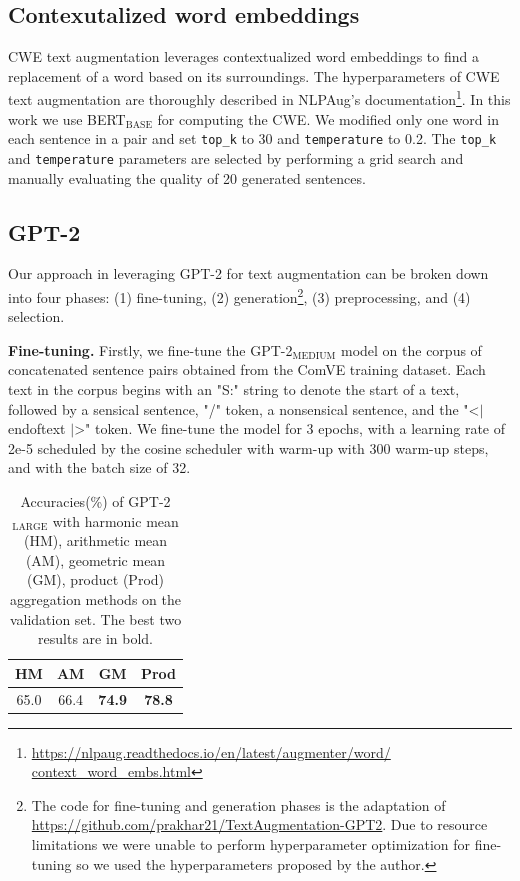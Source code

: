 \documentclass[10pt, a4paper]{article}
\begin{document}
\subsection{Contexutalized word embeddings}
\label{cwe}
CWE text augmentation leverages contextualized word embeddings to find a replacement of a word based on its surroundings. The hyperparameters of CWE text augmentation are thoroughly described in NLPAug's documentation\footnote{\href{https://nlpaug.readthedocs.io/en/latest/augmenter/\\word/context\_word\_embs.html}{https://nlpaug.readthedocs.io/en/latest/augmenter/word/\\context\_word\_embs.html}}. In this work we use BERT$_{\text{BASE}}$ for computing the CWE. We modified only one word in each sentence in a pair and set \texttt{top\_k} to 30 and \texttt{temperature} to 0.2. The \texttt{top\_k} and \texttt{temperature} parameters are selected by performing a grid search and manually evaluating the quality of 20 generated sentences.

\subsection{GPT-2}
Our approach in leveraging GPT-2 for text augmentation can be broken down into four phases: (1) fine-tuning, (2) generation\footnote{The code for fine-tuning and generation phases is the adaptation of \href{https://github.com/prakhar21/TextAugmentation-GPT2}{https://github.com/prakhar21/TextAugmentation-GPT2}. Due to resource limitations we were unable to perform hyperparameter optimization for fine-tuning so we used the hyperparameters proposed by the author.}, (3) preprocessing, and (4) selection.

\textbf{Fine-tuning.} Firstly, we fine-tune the GPT-2$_\text{MEDIUM}$ model on the corpus of concatenated sentence pairs obtained from the ComVE training dataset. Each text in the corpus begins with an "S:" string to denote the start of a text, followed by a sensical sentence, "/" token, a nonsensical sentence, and the "\textless$\vert$ endoftext $\vert$\textgreater" token. We fine-tune the model for 3 epochs, with a learning rate of 2e-5 scheduled by the cosine scheduler with warm-up with 300 warm-up steps, and with the batch size of 32.

\begin{table}[t]
    \caption{Accuracies(\%) of GPT-2$_\text{LARGE}$ with harmonic mean (HM), arithmetic mean (AM), geometric mean (GM), product (Prod) aggregation methods on the validation set. The best two results are in bold.}
    \begin{center}
        

    \begin{tabular}{cccc}
    \toprule
         HM & AM & GM & Prod\\
         \midrule
           65.0 & 66.4 & \textbf{74.9} & \textbf{78.8}\\
          \bottomrule
    \end{tabular}

    \label{tab:LM}

    \end{center}
\end{table}
\end{document}

